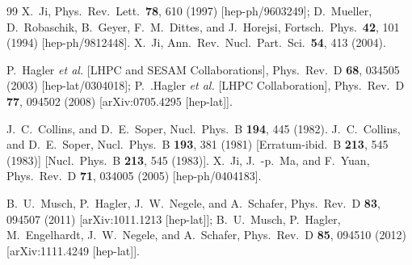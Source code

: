 \begin{thebibliography}{99}
  X.~Ji,
  Phys.\ Rev.\ Lett.\  {\bf 78}, 610 (1997)
  [hep-ph/9603249];
  D.~Mueller, D.~Robaschik, B.~Geyer, F.~M.~Dittes, and J.~Horejsi,
  Fortsch.\ Phys.\  {\bf 42}, 101 (1994)
  [hep-ph/9812448].
  X.~Ji,
  Ann.\ Rev.\ Nucl.\ Part.\ Sci.\  {\bf 54}, 413 (2004).

  P.~Hagler {\it et al.}  [LHPC and SESAM Collaborations],
  Phys.\ Rev.\ D {\bf 68}, 034505 (2003)
  [hep-lat/0304018];
  P.~.Hagler {\it et al.}  [LHPC Collaboration],
  Phys.\ Rev.\ D {\bf 77}, 094502 (2008)
  [arXiv:0705.4295 [hep-lat]].

  J.~C.~Collins, and D.~E.~Soper,
  Nucl.\ Phys.\ B {\bf 194}, 445 (1982).
  J.~C.~Collins, and D.~E.~Soper,
  Nucl.\ Phys.\ B {\bf 193}, 381 (1981)
  [Erratum-ibid.\ B {\bf 213}, 545 (1983)]
  [Nucl.\ Phys.\ B {\bf 213}, 545 (1983)].
  X.~Ji, J.~-p.~Ma, and F.~Yuan,
  Phys.\ Rev.\ D {\bf 71}, 034005 (2005)
  [hep-ph/0404183].


  B.~U.~Musch, P.~Hagler, J.~W.~Negele, and A.~Schafer,
  Phys.\ Rev.\ D {\bf 83}, 094507 (2011)
  [arXiv:1011.1213 [hep-lat]];
  B.~U.~Musch, P.~Hagler, M.~Engelhardt, J.~W.~Negele, and A.~Schafer,
  Phys.\ Rev.\ D {\bf 85}, 094510 (2012)
  [arXiv:1111.4249 [hep-lat]].


\end{thebibliography}

